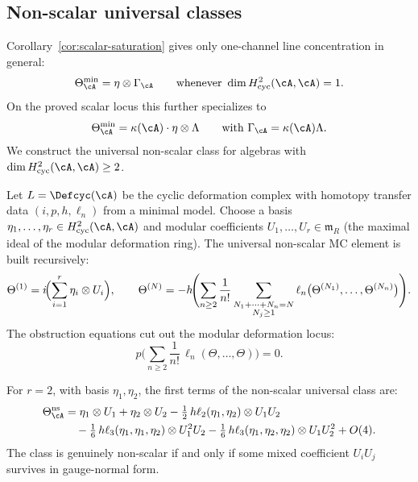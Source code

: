 \subsection{Non-scalar universal classes}
\label{subsec:non-scalar-theta}

Corollary~\ref{cor:scalar-saturation} gives only one-channel
line concentration in general:
\[
\Theta_\cA^{\min} = \eta \otimes \Gamma_{\cA}
\qquad\text{whenever } \dim H^2_{\mathrm{cyc}}(\cA,\cA) = 1.
\]
On the proved scalar locus this further specializes to
\[
\Theta_\cA^{\min} = \kappa(\cA) \cdot \eta \otimes \Lambda
\qquad\text{with } \Gamma_{\cA}=\kappa(\cA)\Lambda.
\]
We construct the universal non-scalar class
for algebras with
$\dim H^2_{\mathrm{cyc}}(\cA,\cA) \geq 2$.

\begin{construction}
\label{constr:non-scalar-hpt}
Let $L = \Defcyc(\cA)$ be the cyclic deformation complex
with homotopy transfer data $(i,p,h,\ell_n)$ from a
minimal model. Choose a basis
$\eta_1, \ldots, \eta_r \in H^2_{\mathrm{cyc}}(\cA,\cA)$
and modular coefficients $U_1, \ldots, U_r \in \mathfrak{m}_{R}$
(the maximal ideal of the modular deformation ring).
The universal non-scalar MC element is built recursively:
\begin{equation}\label{eq:hpt-nonscalar-recursion}
\Theta^{(1)} = i\!\Bigl(\sum_{i=1}^r \eta_i \otimes U_i\Bigr),
\qquad
\Theta^{(N)} = -h\!\Biggl(
 \sum_{n \geq 2} \frac{1}{n!}
 \sum_{\substack{N_1 + \cdots + N_n = N \\ N_j \geq 1}}
 \ell_n\bigl(\Theta^{(N_1)}, \ldots, \Theta^{(N_n)}\bigr)
\Biggr).
\end{equation}
The obstruction equations cut out the modular deformation locus:
\[
p\!\Biggl(
 \sum_{n \geq 2} \frac{1}{n!}\,
 \ell_n(\Theta, \ldots, \Theta)
\Biggr) = 0.
\]
\end{construction}

\begin{example}
\label{ex:two-channel-nonscalar}
For $r = 2$, with basis $\eta_1, \eta_2$, the first
terms of the non-scalar universal class are:
\begin{equation}\label{eq:two-channel-explicit}
\begin{split}
\Theta_\cA^{\mathrm{ns}}
&= \eta_1 \otimes U_1
 + \eta_2 \otimes U_2
 - \tfrac{1}{2}\,h\ell_2(\eta_1,\eta_2)
 \otimes U_1 U_2 \\
&\quad - \tfrac{1}{6}\,h\ell_3(\eta_1,\eta_1,\eta_2)
 \otimes U_1^2 U_2
 - \tfrac{1}{6}\,h\ell_3(\eta_1,\eta_2,\eta_2)
 \otimes U_1 U_2^2
 + O(4).
\end{split}
\end{equation}
The class is genuinely non-scalar if and only if some mixed
coefficient $U_i U_j$ survives in gauge-normal form.
\end{example}

